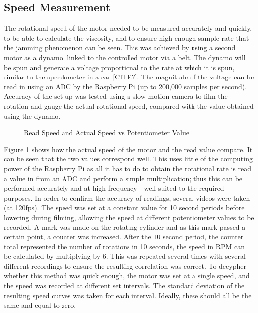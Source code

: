 \documentclass[a4]{report}
\def\br{\newline \newline \noindent}
\begin{document}
	\subsection{Speed Measurement}
	The rotational speed of the motor needed to be measured accurately and quickly, to be able to calculate the viscosity, and to ensure high enough sample rate that the jamming phenomenon can be seen. This was achieved by using a second motor as a dynamo, linked to the controlled motor via a belt. The dynamo will be spun and generate a voltage proportional to the rate at which it is spun, similar to the speedometer in a car [CITE?]. The magnitude of the voltage can be read in using an ADC by the Raspberry Pi (up to 200,000 samples per second). Accuracy of the set-up was tested using a slow-motion camera to film the rotation and gauge the actual rotational speed, compared with the value obtained using the dynamo.
	\begin{figure}[!htb]
		\centering
		\caption{Read Speed and Actual Speed vs Potentiometer Value}
		\label{figdynocheck}
	\end{figure} \newline  \noindent
	Figure \ref{figdynocheck} shows how the actual speed of the motor and the read value compare. It can be seen that the two values correspond well. This uses little of the computing power of the Raspberry Pi as all it has to do to obtain the rotational rate is read a value in from an ADC and perform a simple multiplication; thus this can be performed accurately and at high frequency - well suited to the required purposes.\br
	In order to confirm the accuracy of readings, several videos were taken (at 120fps). The speed was set at a constant value for 10 second periods before lowering during filming, allowing the speed at different potentiometer values to be recorded. A mark was made on the rotating cylinder and as this mark passed a certain point, a counter was increased. After the 10 second period, the counter total represented the number of rotations in 10 seconds, the speed in RPM can be calculated by multiplying by 6. This was repeated several times with several different recordings to ensure the resulting correlation was correct. \br
	To decypher whether this method was quick enough, the motor was set at a single speed, and the speed was recorded at different set intervals. The standard deviation of the resulting speed curves was taken for each interval. Ideally, these should all be the same and equal to zero. %
	
\end{document}

